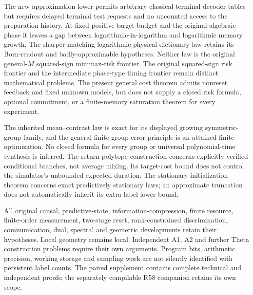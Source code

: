 The new approximation lower permits arbitrary classical terminal
decoder tables but requires delayed terminal test requests and no
uncounted access to the preparation history.  At fixed positive target
budget and the original algebraic phase it leaves a gap between
logarithmic-in-logarithm and logarithmic memory growth.  The sharper
matching logarithmic physical-dictionary law retains its Born-readout
and badly-approximable hypotheses.  Neither law is the original
general-$M$ squared-sign minimax-risk frontier.  The original squared-sign risk frontier and the intermediate
phase-type timing frontier remain distinct mathematical problems.
The present general cost theorem admits nonreset feedback and fixed
unknown models, but does not supply a closed risk formula, optional
commitment, or a finite-memory saturation theorem for every experiment.

The inherited mean--contrast law is exact for its displayed growing
symmetric-group family, and the general finite-group error principle
is an attained finite optimization.  No closed formula for every group
or universal polynomial-time synthesis is inferred.  The return-polytope
construction concerns explicitly verified conditional branches, not
average mixing.  Its target-cost bound does not control the simulator's
unbounded expected duration.  The stationary-initialization theorem
concerns exact predictively stationary laws; an approximate truncation
does not automatically inherit its extra-label lower bound.

All original causal, predictive-state, information-compression, finite
resource, finite-order measurement, two-stage reset, rank-constrained
discrimination, communication, dual, spectral and geometric developments
retain their hypotheses.  Local geometry remains local.  Independent
A1, A2 and further Theta construction problems require their own
arguments.  Program bits, arithmetic precision, working storage and
sampling work are not silently identified with persistent label counts.
The paired supplement contains complete technical and independent
proofs; the separately compilable R58 companion retains its own scope.

\renewcommand{\bibliofont}{\footnotesize\setlength{\baselineskip}{10.8pt}}


